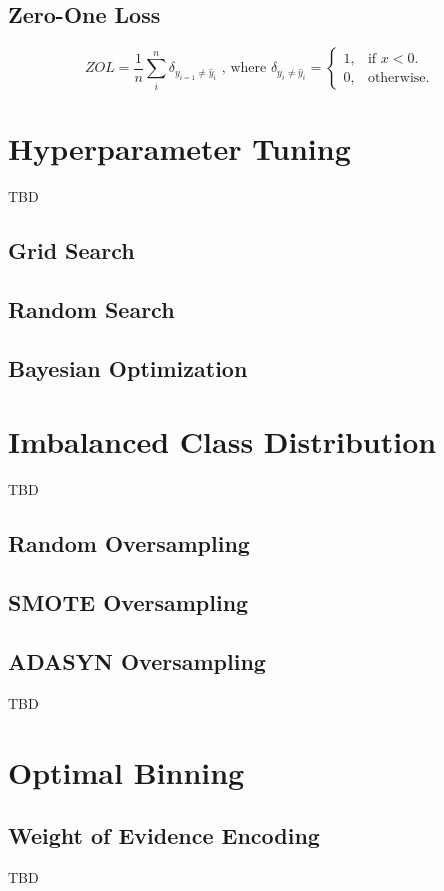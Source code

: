 \subsection{Zero-One Loss}

\begin{equation}\label{eq}
    ZOL = \frac{1}{n} \sum_{i}^{n} \delta_{y_{i=1} \neq \hat{y}_{i}} \text{ , where } \delta_{y_{i} \neq \hat{y}_{i}} = \begin{cases}
        1, & \text{if $x<0$}.\\
        0, & \text{otherwise}.
      \end{cases}
\end{equation}
\section{Hyperparameter Tuning}
TBD
\subsection{Grid Search}
\subsection{Random Search}
\subsection{Bayesian Optimization}
\section{Imbalanced Class Distribution}
TBD
\subsection{Random Oversampling}
\subsection{SMOTE Oversampling}
\subsection{ADASYN Oversampling}
TBD
\section{Optimal Binning}
\subsection{Weight of Evidence Encoding}
TBD